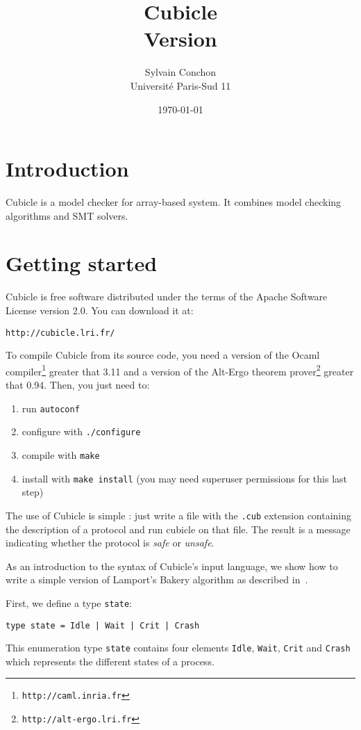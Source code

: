 \documentclass[a4paper,12pt]{article}
\title{\textbf{\Huge Cubicle}\\\Large Version \version}
\author{{\Large Sylvain Conchon} \\[1em] Universit\'e Paris-Sud 11}
\date\today
\begin{document}
\maketitle

\newpage

\section{Introduction}

Cubicle is a model checker for array-based system. It combines model
checking algorithms and SMT solvers.

\section{Getting started}

Cubicle is free software distributed under the terms of the Apache
Software License version 2.0. You can download it at:

\begin{center}
  \texttt{http://cubicle.lri.fr/}
\end{center}

To compile Cubicle from its source code, you need a version of the
Ocaml compiler\footnote{\texttt{http://caml.inria.fr}} greater that
3.11 and a version of the Alt-Ergo theorem
prover\footnote{\texttt{http://alt-ergo.lri.fr}} greater that
0.94. Then, you just need to:

\begin{enumerate}
  \item run \texttt{autoconf}
  \item configure with \texttt{./configure}
  \item compile with \texttt{make}
  \item install with \texttt{make install} (you may need superuser
    permissions for this last step)
\end{enumerate}

The use of Cubicle is simple : just write a file with the
\texttt{.cub} extension containing the description of a protocol and
run cubicle on that file. The result is a message indicating whether
the protocol is \emph{safe} or \emph{unsafe}.

As an introduction to the syntax of Cubicle's input language, we show
how to write a simple version of Lamport's Bakery algorithm as
described in~\cite{Abdulla}.

First, we define a type \texttt{state}:
\begin{verbatim}
type state = Idle | Wait | Crit | Crash
\end{verbatim}
%
This enumeration type \texttt{state} contains four elements
\texttt{Idle}, \texttt{Wait}, \texttt{Crit} and \texttt{Crash} which
represents the different states of a process.
\end{document}
